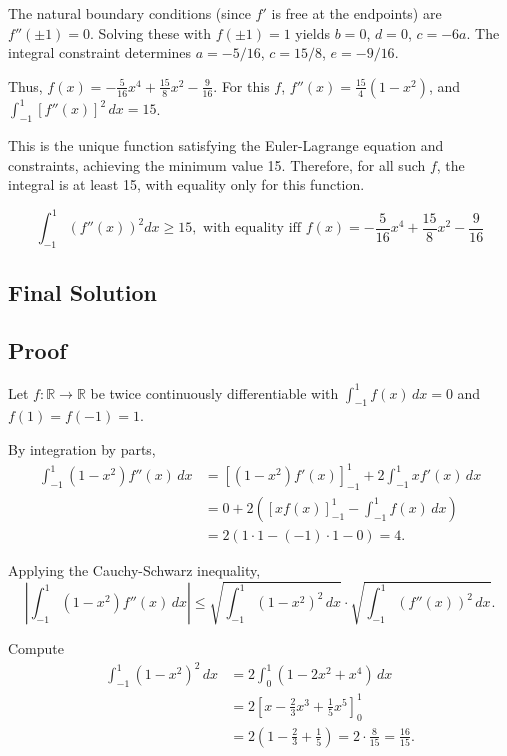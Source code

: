 \documentclass[12pt,a4paper]{article}
\theoremstyle{definition}
\begin{document}
    The natural boundary conditions (since $f'$ is free at the endpoints) are $f''(\pm 1) = 0$. Solving these with $f(\pm 1) = 1$ yields $b = 0$, $d = 0$, $c = -6a$. The integral constraint determines $a = -5/16$, $c = 15/8$, $e = -9/16$.

    Thus, $f(x) = -\frac{5}{16} x^4 + \frac{15}{8} x^2 - \frac{9}{16}$. For this $f$, $f''(x) = \frac{15}{4} (1 - x^2)$, and $\int_{-1}^{1} [f''(x)]^2 \, dx = 15$.

    This is the unique function satisfying the Euler-Lagrange equation and constraints, achieving the minimum value 15. Therefore, for all such $f$, the integral is at least 15, with equality only for this function.

    $$\boxed{\int_{-1}^{1}(f''(x))^{2}dx\geq15, \text{ with equality iff } f(x)=-\frac{5}{16}x^{4}+\frac{15}{8}x^{2}-\frac{9}{16}}$$
\subsection{Final Solution}
    \subsection*{Proof}

    Let $f: \mathbb{R} \to \mathbb{R}$ be twice continuously differentiable with $\int_{-1}^{1} f(x) \, dx = 0$ and $f(1) = f(-1) = 1$.

    By integration by parts,
    \begin{align}
        \int_{-1}^{1} (1 - x^2) f''(x) \, dx &= \left[ (1 - x^2) f'(x) \right]_{-1}^{1} + 2 \int_{-1}^{1} x f'(x) \, dx \\
        &= 0 + 2 \left( \left[ x f(x) \right]_{-1}^{1} - \int_{-1}^{1} f(x) \, dx \right) \\
        &= 2 \left( 1 \cdot 1 - (-1) \cdot 1 - 0 \right) = 4.
    \end{align}

    Applying the Cauchy-Schwarz inequality,
    \[
        \left| \int_{-1}^{1} (1 - x^2) f''(x) \, dx \right| \leq \sqrt{\int_{-1}^{1} (1 - x^2)^2 \, dx} \cdot \sqrt{\int_{-1}^{1} (f''(x))^2 \, dx}.
    \]

    Compute
    \begin{align}
        \int_{-1}^{1} (1 - x^2)^2 \, dx &= 2 \int_{0}^{1} (1 - 2x^2 + x^4) \, dx \\
        &= 2 \left[ x - \frac{2}{3} x^3 + \frac{1}{5} x^5 \right]_{0}^{1} \\
        &= 2 \left( 1 - \frac{2}{3} + \frac{1}{5} \right) = 2 \cdot \frac{8}{15} = \frac{16}{15}.
    \end{align}
\end{document}
